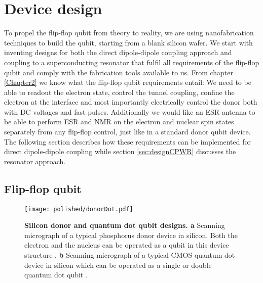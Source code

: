 \section{Device design} \label{sec:deviceDesign}

To propel the flip-flop qubit from theory to reality, we are using nanofabrication techniques to build the qubit, starting from a blank silicon wafer. We start with inventing designs for both the direct dipole-dipole coupling approach and coupling to a superconducting resonator that fulfil all requirements of the flip-flop qubit and comply with the fabrication tools available to us. 
From chapter \ref{Chapter2} we know what the flip-flop qubit requirements entail: We need to be able to readout the electron state, control the tunnel coupling, confine the electron at the interface and most importantly electrically control the donor both with DC voltages and fast pulses.
Additionally we would like an ESR antenna to be able to perform ESR and NMR on the electron and nuclear spin states separately from any flip-flop control, just like in a standard donor qubit device.  The following section describes how these requirements can be implemented for direct dipole-dipole coupling while section \ref{sec:designCPWR} discusses the resonator approach. 

\subsection{Flip-flop qubit} \label{sec:designFF}

\begin{figure}
	\centering
	\texttt{[image: polished/donorDot.pdf]}
	\caption[Silicon donor and quantum dot qubit designs]{\textbf{Silicon donor and quantum dot qubit designs. a} Scanning micrograph of a typical phosphorus donor device in silicon. Both the electron and the nucleus can be operated as a qubit in this device structure \cite{Muhonen2014}. \textbf{b} Scanning micrograph of a typical CMOS quantum dot device in silicon which can be operated as a single or double quantum dot qubit \cite{Veldhorst2014}.}
	\label{fig:donorDotDevices}
\end{figure}

